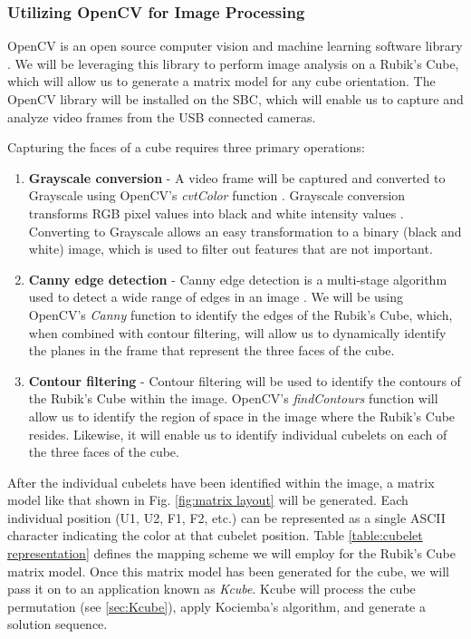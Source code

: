 \documentclass[11pt,english]{article}
\begin{document}
\subsubsection{Utilizing OpenCV for Image Processing}
\label{sec:image processing}
OpenCV is an open source computer vision and machine learning software library \cite{OpenCV}. We will be leveraging this library to perform image analysis on a Rubik's Cube, which will allow us to generate a matrix model for any cube orientation. The OpenCV library will be installed on the SBC, which will enable us to capture and analyze video frames from the USB connected cameras.

Capturing the faces of a cube requires three primary operations:

\begin{enumerate}
  \item \textbf{Grayscale conversion} -
 A video frame will be captured and converted to Grayscale using OpenCV's \textit{cvtColor} function \cite{cvtColor}. Grayscale conversion transforms RGB pixel values into black and white intensity values \cite{Grayscale}. Converting to Grayscale allows an easy transformation to a binary (black and white) image, which is used to filter out features that are not important.
  \item  \textbf{Canny edge detection} -
 Canny edge detection is a multi-stage algorithm used to detect a wide range of edges in an image \cite{Canny Edge Detection}. We will be using OpenCV's \textit{Canny} function \cite{OpenCV Canny} to identify the edges of the Rubik's Cube, which, when combined with contour filtering, will allow us to dynamically identify the planes in the frame that represent the three faces of the cube.

  \item \textbf{Contour filtering} -
 Contour filtering will be used to identify the contours of the Rubik's Cube within the image. OpenCV's \textit{findContours} function \cite{findContours} will allow us to identify the region of space in the image where the Rubik's Cube resides. Likewise, it will enable us to identify individual cubelets on each of the three faces of the cube.
\end{enumerate}

After the individual cubelets have been identified within the image, a matrix model like that shown in Fig. \ref{fig:matrix layout} will be generated. Each individual position (U1, U2, F1, F2, etc.) can be represented as a single ASCII character indicating the color at that cubelet position. Table \ref{table:cubelet representation} defines the mapping scheme we will employ for the Rubik's Cube matrix model. Once this matrix model has been generated for the cube, we will pass it on to an application known as \textit{Kcube}. Kcube will process the cube permutation (see \ref{sec:Kcube}), apply Kociemba's algorithm, and generate a solution sequence.
\end{document}
